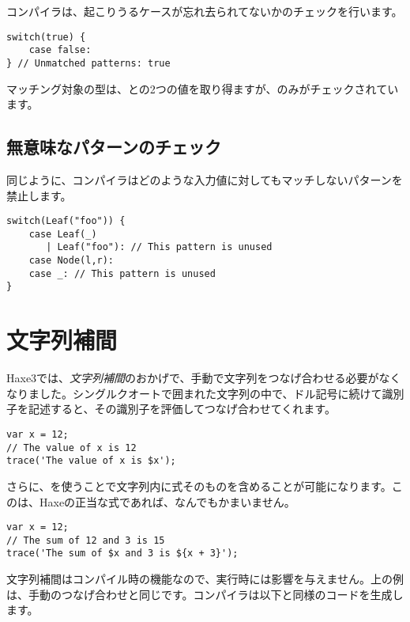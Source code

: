 コンパイラは、起こりうるケースが忘れ去られてないかのチェックを行います。

\begin{lstlisting}
switch(true) {
    case false:
} // Unmatched patterns: true
\end{lstlisting}

マッチング対象の型は、との2つの値を取り得ますが、のみがチェックされています。


\subsection{無意味なパターンのチェック}
\label{lf-pattern-matching-unused}

同じように、コンパイラはどのような入力値に対してもマッチしないパターンを禁止します。

\begin{lstlisting}
switch(Leaf("foo")) {
    case Leaf(_)
       | Leaf("foo"): // This pattern is unused
    case Node(l,r):
    case _: // This pattern is unused
}
\end{lstlisting}

\section{文字列補間}
\label{lf-string-interpolation}

Haxe3では、\emph{文字列補間}のおかげで、手動で文字列をつなげ合わせる必要がなくなりました。シングルクオートで囲まれた文字列の中で、ドル記号\expr{\$}に続けて識別子を記述すると、その識別子を評価してつなげ合わせてくれます。

\begin{lstlisting}
var x = 12;
// The value of x is 12
trace('The value of x is $x');
\end{lstlisting}

さらに、を使うことで文字列内に式そのものを含めることが可能になります。このは、Haxeの正当な式であれば、なんでもかまいません。

\begin{lstlisting}
var x = 12;
// The sum of 12 and 3 is 15
trace('The sum of $x and 3 is ${x + 3}');
\end{lstlisting}

文字列補間はコンパイル時の機能なので、実行時には影響を与えません。上の例は、手動のつなげ合わせと同じです。コンパイラは以下と同様のコードを生成します。

